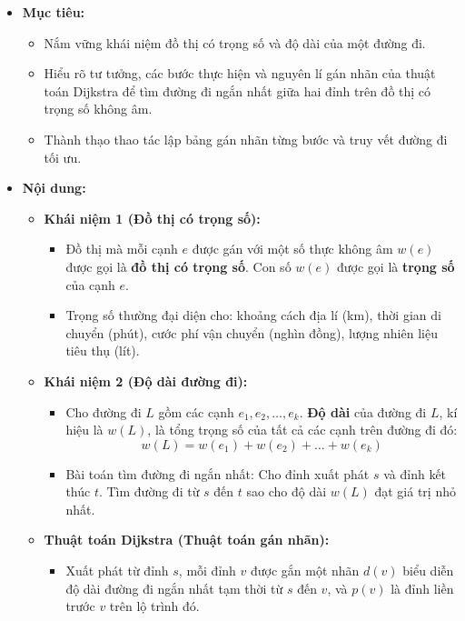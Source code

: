 \documentclass[12pt, a4paper]{article}
\begin{document}
\begin{itemize}[leftmargin=1.2cm]
    \item[a)] \textbf{Mục tiêu:}
    \begin{itemize}[leftmargin=0.6cm]
        \item Nắm vững khái niệm đồ thị có trọng số và độ dài của một đường đi.
        \item Hiểu rõ tư tưởng, các bước thực hiện và nguyên lí gán nhãn của thuật toán Dijkstra để tìm đường đi ngắn nhất giữa hai đỉnh trên đồ thị có trọng số không âm.
        \item Thành thạo thao tác lập bảng gán nhãn từng bước và truy vết đường đi tối ưu.
    \end{itemize}

    \item[b)] \textbf{Nội dung:}
    \begin{itemize}[leftmargin=0.6cm]
        \item \textbf{Khái niệm 1 (Đồ thị có trọng số):}
        \begin{itemize}
            \item Đồ thị mà mỗi cạnh $e$ được gán với một số thực không âm $w(e)$ được gọi là \textbf{đồ thị có trọng số}. Con số $w(e)$ được gọi là \textbf{trọng số} của cạnh $e$.
            \item Trọng số thường đại diện cho: khoảng cách địa lí (km), thời gian di chuyển (phút), cước phí vận chuyển (nghìn đồng), lượng nhiên liệu tiêu thụ (lít).
        \end{itemize}
        \item \textbf{Khái niệm 2 (Độ dài đường đi):}
        \begin{itemize}
            \item Cho đường đi $L$ gồm các cạnh $e_1, e_2, \dots, e_k$. \textbf{Độ dài} của đường đi $L$, kí hiệu là $w(L)$, là tổng trọng số của tất cả các cạnh trên đường đi đó:
            $$w(L) = w(e_1) + w(e_2) + \dots + w(e_k)$$
            \item Bài toán tìm đường đi ngắn nhất: Cho đỉnh xuất phát $s$ và đỉnh kết thúc $t$. Tìm đường đi từ $s$ đến $t$ sao cho độ dài $w(L)$ đạt giá trị nhỏ nhất.
        \end{itemize}
        \item \textbf{Thuật toán Dijkstra (Thuật toán gán nhãn):}
        \begin{itemize}
            \item Xuất phát từ đỉnh $s$, mỗi đỉnh $v$ được gắn một nhãn $d(v)$ biểu diễn độ dài đường đi ngắn nhất tạm thời từ $s$ đến $v$, và $p(v)$ là đỉnh liền trước $v$ trên lộ trình đó.

\end{itemize}
\end{itemize}
\end{itemize}
\end{document}

